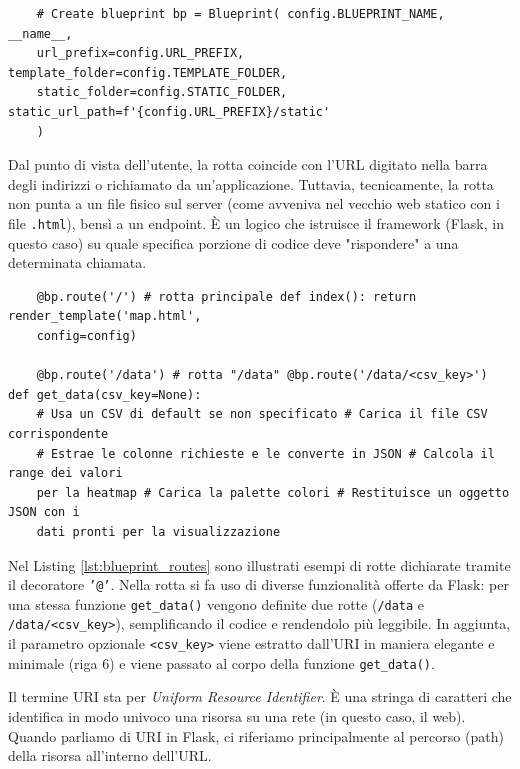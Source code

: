 \begin{listing}
  [h]
  \caption{Creazione di una Blueprint}
  \label{lst:create_heatmap_blueprint}
  \begin{verbatim}
    # Create blueprint bp = Blueprint( config.BLUEPRINT_NAME, __name__,
    url_prefix=config.URL_PREFIX, template_folder=config.TEMPLATE_FOLDER,
    static_folder=config.STATIC_FOLDER, static_url_path=f'{config.URL_PREFIX}/static'
    )
  \end{verbatim}
\end{listing}

Dal punto di vista dell'utente, la rotta coincide con l'URL digitato nella barra
degli indirizzi o richiamato da un'applicazione. Tuttavia, tecnicamente, la rotta
non punta a un file fisico sul server (come avveniva nel vecchio web statico con
i file \texttt{.html}), bensì a un endpoint. È un  logico che istruisce
il framework (Flask, in questo caso) su quale specifica porzione di codice deve
"rispondere" a una determinata chiamata.

\begin{listing}
  [H]
  \caption{Dichiarazione di rotte del \textit{blueprint}}
  \label{lst:blueprint_routes}
  \begin{verbatim}
    @bp.route('/') # rotta principale def index(): return render_template('map.html',
    config=config)

    @bp.route('/data') # rotta "/data" @bp.route('/data/<csv_key>') def get_data(csv_key=None):
    # Usa un CSV di default se non specificato # Carica il file CSV corrispondente
    # Estrae le colonne richieste e le converte in JSON # Calcola il range dei valori
    per la heatmap # Carica la palette colori # Restituisce un oggetto JSON con i
    dati pronti per la visualizzazione
  \end{verbatim}
\end{listing}

Nel Listing \ref{lst:blueprint_routes} sono illustrati esempi di rotte dichiarate
tramite il decoratore \texttt{'@'}. Nella rotta  si fa uso
di diverse funzionalità offerte da Flask: per una stessa funzione \texttt{get\_data()}
vengono definite due rotte (\texttt{/data} e \texttt{/data/<csv\_key>}), semplificando
il codice e rendendolo più leggibile. In aggiunta, il parametro opzionale \texttt{<csv\_key>}
viene estratto dall'URI in maniera elegante e minimale (riga 6) e viene passato
al corpo della funzione \texttt{get\_data()}.

Il termine URI sta per \textit{Uniform Resource Identifier}. È una stringa di caratteri
che identifica in modo univoco una risorsa su una rete (in questo caso, il web).
Quando parliamo di URI in Flask, ci riferiamo principalmente al percorso (path)
della risorsa all'interno dell'URL.

